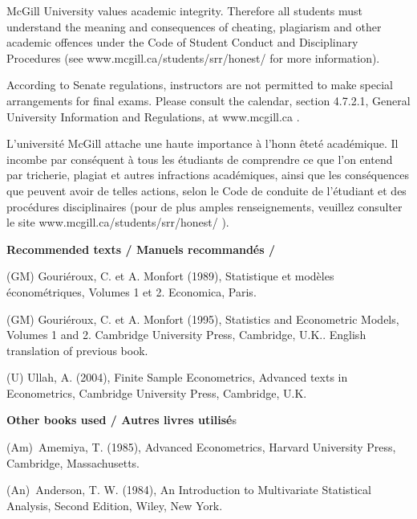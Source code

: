 \documentclass[titlepage,11pt,amstex]{article}
\begin{document}
\noindent McGill University values academic integrity. Therefore all
students must understand the meaning and consequences of cheating,
plagiarism and other academic offences under the Code of Student Conduct and
Disciplinary Procedures (see www.mcgill.ca/students/srr/honest/ for more
information).

\noindent According to Senate regulations, instructors are not permitted to
make special arrangements for final exams. Please consult the calendar,
section 4.7.2.1, General University Information and Regulations, at
www.mcgill.ca .

\quad

\noindent L'universit\'{e} McGill attache une haute importance \`{a} l'honn%
\^{e}tet\'{e} acad\'{e}mique. Il incombe par cons\'{e}quent \`{a} tous les 
\'{e}tudiants de comprendre ce que l'on entend par tricherie, plagiat et
autres infractions acad\'{e}miques, ainsi que les cons\'{e}quences que
peuvent avoir de telles actions, selon le Code de conduite de l'\'{e}tudiant
et des proc\'{e}dures disciplinaires (pour de plus amples renseignements,
veuillez consulter le site www.mcgill.ca/students/srr/honest/ ).

\quad \newpage

\begin{center}
\textbf{Recommended texts / Manuels recommand\'{e}s / }

\quad
\end{center}

(GM) Gouri\'{e}roux, C. et A. Monfort (1989), Statistique et mod\`{e}les 
\'{e}conom\'{e}triques, Volumes 1 et 2. Economica, Paris.

(GM) Gouri\'{e}roux, C. et A. Monfort (1995), Statistics and Econometric
Models, Volumes 1 and 2. Cambridge University Press, Cambridge, U.K..
English translation of previous book.

(U) Ullah, A. (2004), Finite Sample Econometrics, Advanced texts in
Econometrics, Cambridge University Press, Cambridge, U.K.

\quad

\begin{center}
\textbf{Other books used / Autres livres utilis\'{e}}s

\quad
\end{center}

(Am)\ Amemiya, T. (1985), Advanced Econometrics, Harvard University Press,
Cambridge, Massachusetts.

(An)\ Anderson, T. W. (1984), An Introduction to Multivariate Statistical
Analysis, Second Edition, Wiley, New York.
\end{document}

